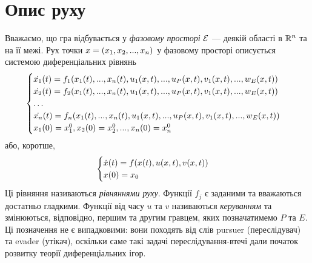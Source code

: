 
\section{Опис руху}
Вважаємо, що гра відбувається у \emph{фазовому просторі} $\mathcal{E}$ --- деякій області в $\mathbb{R}^n$ та на її межі.
Рух точки $x = \left(x_1, x_2, ..., x_n \right)$ у фазовому просторі описується системою диференціальних рівнянь
\begin{gather}\label{eq_1}
    \begin{cases}
        \dot{x_1}(t) = f_1(x_1(t), ..., x_n(t), u_1(x, t), ..., u_P(x, t), v_1(x, t), ..., w_E(x, t)) \\
        \dot{x_2}(t) = f_2(x_1(t), ..., x_n(t), u_1(x, t), ..., u_P(x, t), v_1(x, t), ..., w_E(x, t)) \\
        \dots \\
        \dot{x_n}(t) = f_n(x_1(t), ..., x_n(t), u_1(x, t), ..., u_P(x, t), v_1(x, t), ..., w_E(x, t)) \\
        x_1(0) = x_1^0, x_2(0) = x_2^0, ..., x_n(0) = x_n^0
    \end{cases}
\end{gather}
або, коротше,
\begin{gather}\label{eq_2}
    \begin{cases}
        \dot{x}(t) = {f}(x(t), u(x, t), v(x, t)) \\
        x(0) = x_0
    \end{cases}
\end{gather}
Ці рівняння називаються \emph{рівняннями руху}. Функції $f_j$ є заданими та вважаються достатньо гладкими.
Функції від часу $u$ та $v$ називаються \emph{керуванням} та змінюються, відповідно, першим та другим гравцем, яких
позначатимемо $P$ та $E$. Ці позначення не є випадковими: вони походять від слів pursuer (переслідувач) та evader (утікач), оскільки
саме такі задачі переслідування-втечі дали початок розвитку теорії диференціальних ігор.

